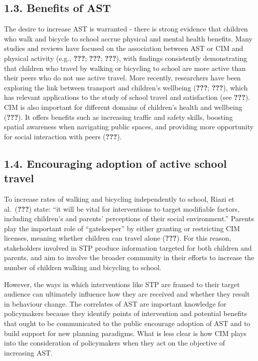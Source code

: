 \documentclass[]{elsarticle} %
\begin{document}
\hypertarget{benefits-of-ast}{%
\subsection{1.3. Benefits of AST}\label{benefits-of-ast}}

The desire to increase AST is warranted - there is strong evidence that
children who walk and bicycle to school accrue physical and mental
health benefits. Many studies and reviews have focused on the
association between AST or CIM and physical activity (e.g.,
{\textbf{???}}; {\textbf{???}}; {\textbf{???}}), with findings
consistently demonstrating that children who travel by walking or
bicycling to school are more active than their peers who do not use
active travel. More recently, researchers have been exploring the link
between transport and children's wellbeing ({\textbf{???}};
{\textbf{???}}), which has relevant applications to the study of school
travel and satisfaction (see {\textbf{???}}). CIM is also important for
different domains of children's health and wellbeing ({\textbf{???}}).
It offers benefits such as increasing traffic and safety skills,
boosting spatial awareness when navigating public spaces, and providing
more opportunity for social interaction with peers ({\textbf{???}}).

\hypertarget{encouraging-adoption-of-active-school-travel}{%
\subsection{1.4. Encouraging adoption of active school
travel}\label{encouraging-adoption-of-active-school-travel}}

To increase rates of walking and bicycling independently to school,
Riazi et al.~({\textbf{???}}) state: ``it will be vital for
interventions to target modifiable factors, including children's and
parents' perceptions of their social environment.'' Parents play the
important role of ``gatekeeper'' by either granting or restricting CIM
licenses, meaning whether children can travel alone ({\textbf{???}}).
For this reason, stakeholders involved in STP produce information
targeted for both children and parents, and aim to involve the broader
community in their efforts to increase the number of children walking
and bicycling to school.

However, the ways in which interventions like STP are framed to their
target audience can ultimately influence how they are received and
whether they result in behaviour change. The correlates of AST are
important knowledge for policymakers because they identify points of
intervention and potential benefits that ought to be communicated to the
public encourage adoption of AST and to build support for new planning
paradigms. What is less clear is how CIM plays into the consideration of
policymakers when they act on the objective of increasing AST.
\end{document}
